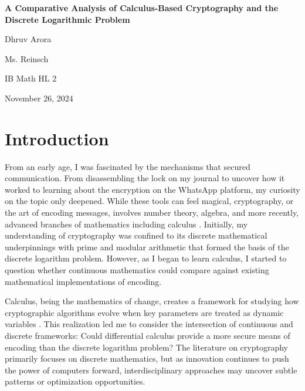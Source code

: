 \documentclass[12pt]{article}
\begin{document}
\begin{titlepage}
    \begin{center}
        \vspace*{1in}

        \Large \textbf{A Comparative Analysis of Calculus-Based Cryptography and the Discrete Logarithmic Problem} \\

        \vspace{0.5in}

        \Large Dhruv Arora \\

        \vspace{0.25in}

        Ms. Reinsch

        \vspace{0.25in}

        IB Math HL 2

        \vspace{0.25in}

        November  26, 2024

        \vspace{1.5in}
    \end{center}
\end{titlepage}

\newpage

\section*{Introduction}

From an early age, I was fascinated by the mechanisms that secured communication. From disassembling the lock on my journal to uncover how it worked to learning about the encryption on the WhatsApp platform, my curiosity on the topic only deepened. While these tools can feel magical, cryptography, or the art of encoding messages, involves number theory, algebra, and more recently, advanced branches of mathematics including calculus \cite{Loxton1990}. Initially, my understanding of cryptography was confined to its discrete mathematical underpinnings with prime and modular arithmetic that formed the basis of the discrete logarithm problem. However, as I began to learn calculus, I started to question whether continuous mathematics could compare against existing mathematical implementations of encoding.

Calculus, being the mathematics of change, creates a framework for studying how cryptographic algorithms evolve when key parameters are treated as dynamic variables \cite{MITCalculus}. This realization led me to consider the intersection of continuous and discrete frameworks: Could differential calculus provide a more secure means of encoding than the discrete logarithm problem? The literature on cryptography primarily focuses on discrete mathematics, but as innovation continues to push the power of computers forward, interdisciplinary approaches may uncover subtle patterns or optimization opportunities.
\end{document}
